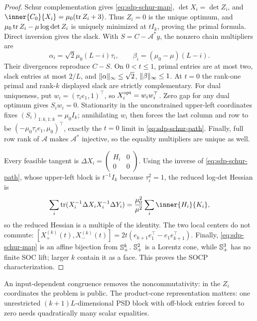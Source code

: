 \begin{proof}
Schur complementation gives \eqref{eq:sdp-schur-map}, $\det X_i=\det Z_i$,
and $\inner{C_0}{X_i}=\mu_0(\tr Z_i+3)$.  Thus $Z_i=0$ is the unique
optimum, and $\mu_0\operatorname{tr} Z_i-\mu\log\det Z_i$ is uniquely minimized at
$tI_k$, proving the primal formula.  Direct inversion gives the slack.
With $S=C-\mathcal A^*y$, the nonzero chain multipliers are
\begin{equation}
 \alpha_i=\sqrt2\mu_0(L-i)\tau_i,\qquad
 \beta_i=(\mu_0-\mu)(L-i).                                \label{eq:sdp-schur-multipliers}
\end{equation}
Their divergences reproduce $C-S$.  On $0<t\leq1$, primal entries are at
most two, slack entries at most $2/L$, and
$\lVert\alpha\rVert_\infty\leq\sqrt2$, $\lVert\beta\rVert_\infty\leq1$.  At $t=0$ the
rank-one primal and rank-$k$ displayed slack are strictly complementary.
For dual uniqueness, put $w_i=(\tau_i e_1,1)^\top$, so
$X_i^{\rm opt}=w_iw_i^\top$.  Zero gap for any dual optimum gives
$S_iw_i=0$.  Stationarity in the unconstrained upper-left coordinates fixes
$(S_i)_{1:k,1:k}=\mu_0I_k$; annihilating $w_i$ then forces the last column
and row to be $(-\mu_0\tau_i e_1,\mu_0)^\top$, exactly the $t=0$ limit in
\eqref{eq:sdp-schur-path}.  Finally, full row rank of $\mathcal A$ makes
$\mathcal A^*$ injective, so the equality multipliers are unique as well.

Every feasible tangent is
$\Delta X_i=\left(\begin{smallmatrix}H_i&0\\0&0\end{smallmatrix}\right)$.
Using the inverse of \eqref{eq:sdp-schur-path}, whose upper-left block is
$t^{-1}I_k$ because $\tau_i^2=1$, the reduced log-det Hessian is
\[
 \sum_i\tr(X_i^{-1}\Delta X_iX_i^{-1}\Delta Y_i)
 =\frac{\mu_0^2}{\mu^2}\sum_i\inner{H_i}{K_i},
\]
so the reduced Hessian is a multiple of the identity.  The two local centers do not commute:
$[X_+^{(k)}(t),X_-^{(k)}(t)]=2t(e_{k+1}e_1^\top-e_1e_{k+1}^\top)$.
Finally, \eqref{eq:sdp-schur-map} is an affine bijection from $\mathbb{S}_{+}^k$.
$\mathbb{S}_{+}^2$ is a Lorentz cone, while $\mathbb{S}_{+}^3$ has no finite SOC lift; larger
$k$ contain it as a face.  This proves the SOCP characterization.
\end{proof}

An input-dependent congruence removes the noncommutativity: in the $Z_i$
coordinates the problem is public.  The product-cone representation matters:
one unrestricted $(k+1)L$-dimensional PSD block with off-block entries forced
to zero needs quadratically many scalar equalities.

